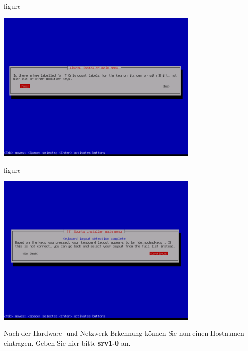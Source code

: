 \begin{nofloat}{figure}
\begin{center}
\includegraphics[width=0.75\textwidth]{screenshots/08_ubuntu_install.png}
\end{center}
\end{nofloat}

\begin{nofloat}{figure}
\begin{center}
\includegraphics[width=0.75\textwidth]{screenshots/09_ubuntu_install.png}
\end{center}
\end{nofloat}

Nach der Hardware- und Netzwerk-Erkennung können Sie nun einen Hostnamen
eintragen. Geben Sie hier bitte \textbf{srv1-0} an.

